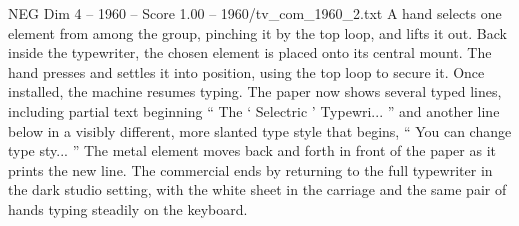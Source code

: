 \begin{textsample}{NEG Dim 4 – 1960 – Score 1.00 – 1960/tv\_com\_1960\_2.txt}
A hand selects one element from among the group, pinching it by the top loop, and lifts it out.
Back inside the typewriter, the chosen element is placed onto its central mount.
The hand presses and settles it into position, using the top loop to secure it.
Once installed, the machine resumes typing.
The paper now shows several typed lines, including partial text beginning “ The ‘ Selectric ’ Typewri... ” and another line below in a visibly different, more slanted type style that begins, “ You can change type sty... ” The metal element moves back and forth in front of the paper as it prints the new line.
The commercial ends by returning to the full typewriter in the dark studio setting, with the white sheet in the carriage and the same pair of hands typing steadily on the keyboard.

\end{textsample}
